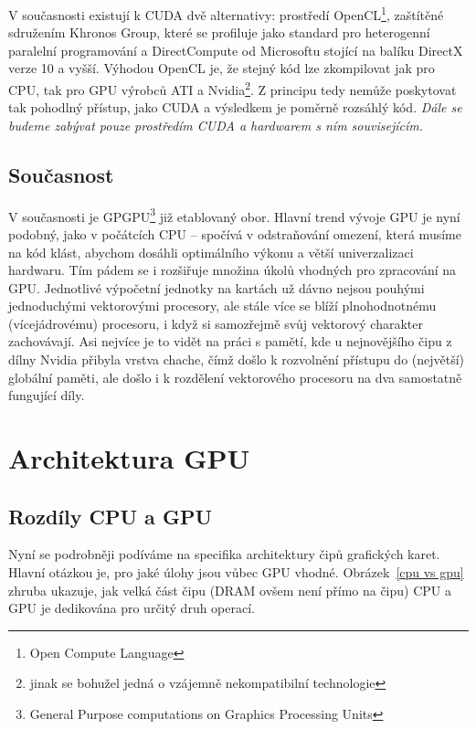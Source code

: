     V současnosti existují k CUDA dvě alternativy: prostředí OpenCL\footnote{Open Compute Language}, zaštítěné sdružením Khronos Group, které se profiluje jako standard pro heterogenní paralelní programování a DirectCompute od Microsoftu stojící na balíku DirectX verze 10 a vyšší. Výhodou OpenCL je, že stejný kód lze zkompilovat jak pro CPU, tak pro GPU výrobců ATI a Nvidia\footnote{jinak se bohužel jedná o vzájemně nekompatibilní technologie}. Z principu tedy nemůže poskytovat tak pohodlný přístup, jako CUDA a výsledkem je poměrně rozsáhlý kód. \emph{Dále se budeme zabývat pouze prostředím CUDA a hardwarem s ním souvisejícím.}

    \subsection{Současnost}

     V současnosti je GPGPU\footnote{General Purpose computations on Graphics Processing Units} již etablovaný obor. Hlavní trend vývoje GPU je nyní podobný, jako v počátcích CPU -- spočívá v odstraňování omezení, která musíme na kód klást, abychom dosáhli optimálního výkonu a větší univerzalizaci hardwaru. Tím pádem se i rozšiřuje množina úkolů vhodných pro zpracování na GPU. Jednotlivé výpočetní jednotky na kartách už dávno nejsou pouhými jednoduchými vektorovými procesory, ale stále více se blíží plnohodnotnému (vícejádrovému) procesoru, i když si samozřejmě svůj vektorový charakter zachovávají. Asi nejvíce je to vidět na práci s pamětí, kde u nejnovějšího čipu \FERMI z dílny Nvidia přibyla vrstva chache, čímž došlo k rozvolnění přístupu do (největší) globální paměti, ale došlo i k rozdělení vektorového procesoru na dva samostatně fungující díly.

\section{Architektura GPU}

    \subsection{Rozdíly CPU a GPU}

        Nyní se podrobněji podíváme na specifika architektury čipů grafických karet. Hlavní otázkou je, pro jaké úlohy jsou vůbec GPU vhodné. Obrázek~\ref{cpu vs gpu} zhruba ukazuje, jak velká část čipu (DRAM ovšem není přímo na čipu) CPU a GPU je dedikována pro určitý druh operací.


